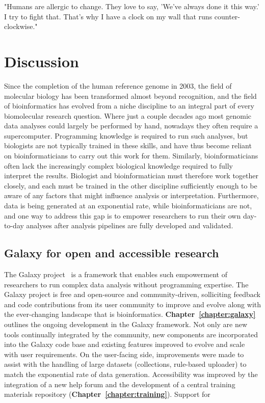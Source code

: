 \begin{savequote}[75mm]
"Humans are allergic to change. They love to say, 'We've always done it this way.' I try to fight that. That's why I have a clock on my wall that runs counter-clockwise."
\end{savequote}

\chapter{Discussion}
\label{discussion}
\setcounter{figure}{-1}
\setcounter{table}{-1}
\setcounter{section}{-1}
\setcounter{NAT@ctr}{-1}

Since the completion of the human reference genome in 2003, the field of molecular biology has been transformed almost beyond recognition, and the field of bioinformatics has evolved from a niche discipline to an integral part of every biomolecular research question. Where just a couple decades ago most genomic data analyses could largely be performed by hand, nowadays they often require a supercomputer. Programming knowledge is required to run such analyses, but biologists are not typically trained in these skills, and have thus become reliant on bioinformaticians to carry out this work for them. Similarly, bioinformaticians often lack the increasingly complex biological knowledge required to fully interpret the results. Biologist and bioinformatician must therefore work together closely, and each must be trained in the other discipline sufficiently enough to be aware of any factors that might influence analysis or interpretation. Furthermore, data is being generated at an exponential rate, while bioinformaticians are not, and one way to address this gap is to empower researchers to run their own day-to-day analyses after analysis pipelines are fully developed and validated.


\section{Galaxy for open and accessible research}
The Galaxy project~\cite{TODO} is a framework that enables such empowerment of researchers to run complex data analysis without programming expertise. The Galaxy project is free and open-source and community-driven, solliciting feedback and code contributions from its user community to improve and evolve along with the ever-changing landscape that is bioinformatics. \textbf{Chapter~\ref{chapter:galaxy}} outlines the ongoing development in the Galaxy framework. Not only are new tools continually integrated by the community, new components are incorporated into the Galaxy code base and existing features improved to evolve and scale with user requirements. On the user-facing side, improvements were made to assist with the handling of large datasets (collections, rule-based uploader) to match the exponential rate of data generation. Accessibility was improved by the integration of a new help forum and the development of a central training materials repository (\textbf{Chapter~\ref{chapter:training}}). Support for





